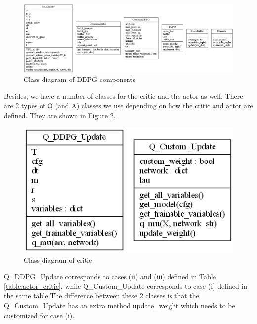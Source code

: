 \begin{figure}[htpb]
\centering
  \includegraphics[width=1.0\textwidth]{figures/ClassDiagram.png}
  \caption[Class diagram]{Class diagram of DDPG components } \label{fig:classdiag}
\end{figure}
\pagebreak
Besides, we have a number of classes for the critic and the actor as well. There are 2 types of Q (and A) classes we use depending on how the critic and actor are defined. They are shown in Figure \ref{fig:classdiagc}.


\begin{figure}[htpb]
\centering
  \includegraphics[width=1.0\textwidth]{figures/QClasses.png}
  \caption[Class diagram - Critic Functions]{Class diagram of critic } \label{fig:classdiagc}
\end{figure}
Q\_DDPG\_Update corresponds to cases (ii) and (iii) defined in Table \ref{table:actor_critic}, while Q\_Custom\_Update corresponds to case (i) defined in the same table.The difference between these 2 classes is that the Q\_Custom\_Update has an extra method update\_weight which needs to be customized for case (i).

\pagebreak
